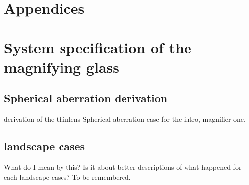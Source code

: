 \chapter{Appendices} %
\label{Appendices} %
\graphicspath{ {./Appendix/figures/} }  %
\captionsetup[figure]{labelfont=bf}
\captionsetup{margin=1.5em}
\captionsetup[table]{labelfont=bf}





\chapter{System specification of the magnifying glass}




\section{Spherical aberration derivation}
derivation of the thinlens Spherical aberration case for the intro, magnifier one. 

\section{landscape cases}
What do I mean by this? Is it about better descriptions of what happened for each landscape cases? To be remembered. 

